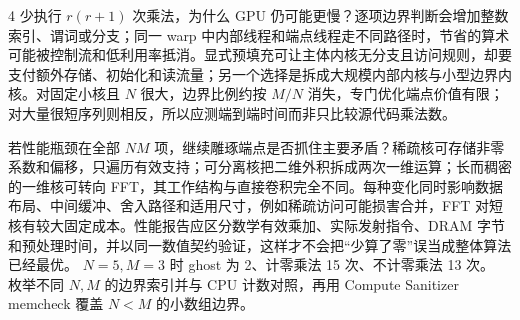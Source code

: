\begin{solutionexercise}{4}
少执行 $r(r+1)$ 次乘法，为什么 GPU 仍可能更慢？逐项边界判断会增加整数索引、谓词或分支；同一 warp 中内部线程和端点线程走不同路径时，节省的算术可能被控制流和低利用率抵消。显式预填充可让主体内核无分支且访问规则，却要支付额外存储、初始化和读流量；另一个选择是拆成大规模内部内核与小型边界内核。对固定小核且 $N$ 很大，边界比例约按 $M/N$ 消失，专门优化端点价值有限；对大量很短序列则相反，所以应测端到端时间而非只比较源代码乘法数。

若性能瓶颈在全部 $NM$ 项，继续雕琢端点是否抓住主要矛盾？稀疏核可存储非零系数和偏移，只遍历有效支持；可分离核把二维外积拆成两次一维运算；长而稠密的一维核可转向 FFT，其工作结构与直接卷积完全不同。每种变化同时影响数据布局、中间缓冲、舍入路径和适用尺寸，例如稀疏访问可能损害合并，FFT 对短核有较大固定成本。性能报告应区分数学有效乘加、实际发射指令、DRAM 字节和预处理时间，并以同一数值契约验证，这样才不会把“少算了零”误当成整体算法已经最优。
\variantheading $N=5,M=3$ 时 ghost 为 2、计零乘法 15 次、不计零乘法 13 次。
\practiceheading 枚举不同 $N,M$ 的边界索引并与 CPU 计数对照，再用 Compute Sanitizer memcheck 覆盖 $N<M$ 的小数组边界。
\end{solutionexercise}

